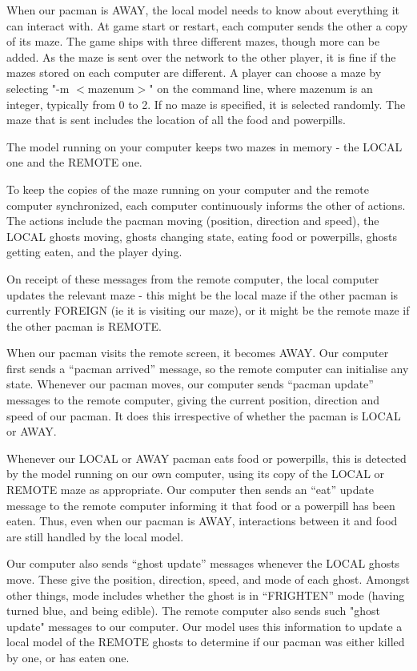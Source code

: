 \documentclass{article}
\begin{document}
When our pacman is AWAY, the local model needs to know about
everything it can interact with.  At game start or restart, each
computer sends the other a copy of its maze.  The game ships with
three different mazes, though more can be added.  As the maze is sent
over the network to the other player, it is fine if the mazes stored
on each computer are different.  A player can choose a maze by
selecting "-m $<$mazenum$>$" on the command line, where mazenum is an
integer, typically from 0 to 2.  If no maze is specified, it is
selected randomly.  The maze that is sent includes the location of all
the food and powerpills.

The model running on your computer keeps two mazes in memory - the
 LOCAL one and the REMOTE one.

To keep the copies of the maze running on your computer and the remote
computer synchronized, each computer continuously informs the other of
actions.  The actions include the pacman moving (position, direction
and speed), the LOCAL ghosts moving, ghosts changing state, eating
food or powerpills, ghosts getting eaten, and the player dying.

On receipt of these messages from the remote computer, the local
computer updates the relevant maze - this might be the local maze if
the other pacman is currently FOREIGN (ie it is visiting our maze), or
it might be the remote maze if the other pacman is REMOTE.

When our pacman visits the remote screen, it becomes AWAY.  Our
computer first sends a ``pacman arrived'' message, so the remote
computer can initialise any state.  Whenever our pacman moves, our
computer sends ``pacman update'' messages to the remote computer,
giving the current position, direction and speed of our pacman.  It
does this irrespective of whether the pacman is LOCAL or AWAY.

Whenever our LOCAL or AWAY pacman eats food or powerpills, this is
detected by the model running on our own computer, using its copy of
the LOCAL or REMOTE maze as appropriate.  Our computer then sends an
``eat'' update message to the remote computer informing it that food
or a powerpill has been eaten.  Thus, even when our pacman is AWAY,
interactions between it and food are still handled by the local model.

Our computer also sends ``ghost update'' messages whenever the LOCAL
 ghosts move.  These give the position, direction, speed, and mode of
 each ghost.  Amongst other things, mode includes whether the ghost is
 in ``FRIGHTEN'' mode (having turned blue, and being edible).  The
 remote computer also sends such "ghost update" messages to our
 computer. Our model uses this information to update a local model of
 the REMOTE ghosts to determine if our pacman was either killed by
 one, or has eaten one.
\end{document}
